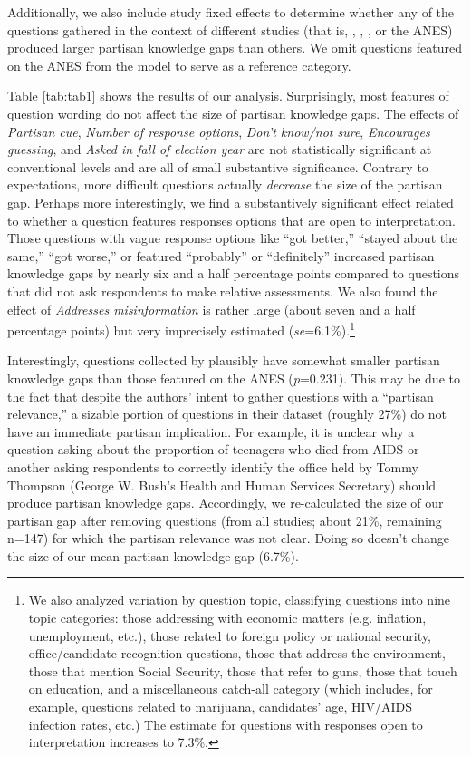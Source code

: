 \documentclass[12pt, letterpaper]{article}
\begin{document}
Additionally, we also include study fixed effects to determine whether any of the questions gathered in the context of different studies (that is, \citet{bullocketal_2015}, \citet{prior2015you}, \citet{jerit2012partisan}, or the ANES) produced larger partisan knowledge gaps than others. We omit questions featured on the ANES from the model to serve as a reference category. 



Table \ref{tab:tab1} shows the results of our analysis. Surprisingly, most features of question wording do not affect the size of partisan knowledge gaps. The effects of \textit{Partisan cue}, \textit{Number of response options}, \textit{Don't know/not sure}, \textit{Encourages guessing}, and \textit{Asked in fall of election year} are not statistically significant at conventional levels and are all of small substantive significance. Contrary to expectations, more difficult questions actually \textit{decrease} the size of the partisan gap. Perhaps more interestingly, we find a substantively significant effect related to whether a question features responses options that are open to interpretation. Those questions with vague response options like ``got better,'' ``stayed about the same,'' ``got worse,'' or featured ``probably'' or ``definitely'' increased partisan knowledge gaps by nearly six and a half percentage points compared to questions that did not ask respondents to make relative assessments. We also found the effect of \textit{Addresses misinformation} is rather large (about seven and a half percentage points) but very imprecisely estimated (\textit{se}=6.1\%).\footnote{We also analyzed variation by question topic, classifying questions into nine topic categories: those addressing with economic matters (e.g. inflation, unemployment, etc.), those related to foreign policy or national security, office/candidate recognition questions, those that address the environment, those that mention Social Security, those that refer to guns, those that touch on education, and a miscellaneous catch-all category (which includes, for example, questions related to marijuana, candidates' age, HIV/AIDS infection rates, etc.) The estimate for questions with responses open to interpretation increases to 7.3\%.} 

Interestingly, questions collected by \citet{jerit2012partisan} plausibly have somewhat smaller partisan knowledge gaps than those featured on the ANES (\textit{p}=0.231). This may be due to the fact that despite the authors' intent to gather questions with a ``partisan relevance,'' a sizable portion of questions in their dataset (roughly 27\%) do not have an immediate partisan implication. For example, it is unclear why a question asking about the proportion of teenagers who died from AIDS or another asking respondents to correctly identify the office held by Tommy Thompson (George W. Bush's Health and Human Services Secretary) should produce partisan knowledge gaps. Accordingly, we re-calculated the size of our partisan gap after removing questions (from all studies; about 21\%, remaining {n}=147) for which the partisan relevance was not clear. Doing so doesn't change the size of our mean partisan knowledge gap (6.7\%). 
\end{document}
